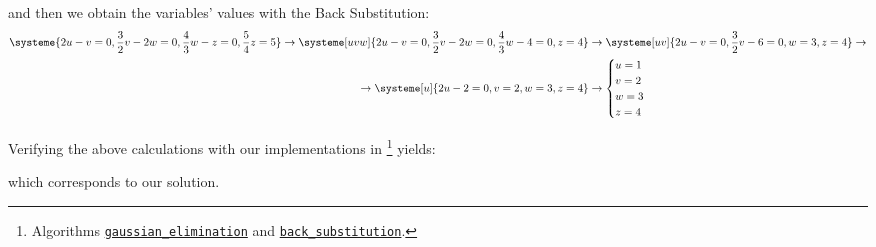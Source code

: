 and then we obtain the variables' values with the Back Substitution:
\begin{equation*}
  \begin{split}
    \systeme{2u-v=0,\frac{3}{2}v-2w=0,\frac{4}{3}w-z=0,\frac{5}{4}z=5}
    \rightarrow
    \systeme[uvw]{2u-v=0,\frac{3}{2}v-2w=0,\frac{4}{3}w-4=0,z=4}
    &\rightarrow
    \systeme[uv]{2u-v=0,\frac{3}{2}v-6=0,w=3,z=4}
    \rightarrow\\
    \rightarrow
    \systeme[u]{2u-2=0,v=2,w=3,z=4}
    &\rightarrow
    \begin{cases}
    u=1\\
    v=2\\
    w=3\\
    z=4
    \end{cases}
\end{split}
\end{equation*}

Verifying the above calculations with our implementations in \MATLAB
\footnote{Algorithms \hyperref[algorithm:gaussian_elimination]{\texttt{gaussian\_elimination}} and \hyperref[algorithm:back_substitution]{\texttt{back\_substitution}}.}
yields:

which corresponds to our solution.
